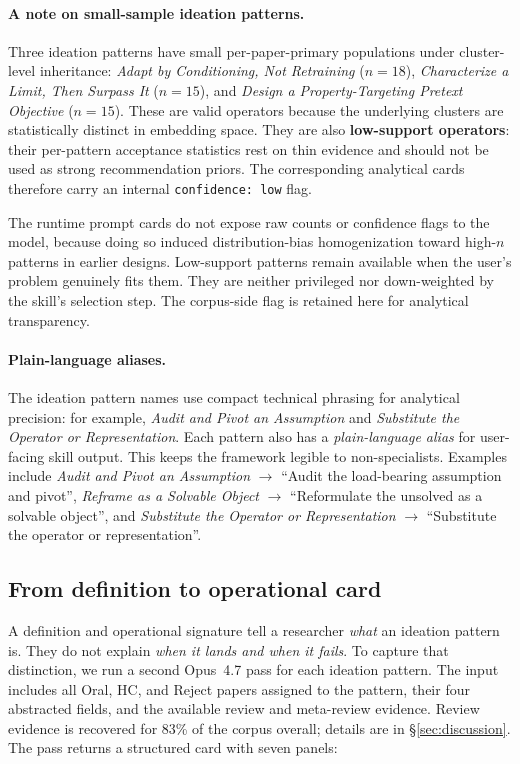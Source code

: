 \documentclass[10pt,a4paper]{article}
\begin{document}
\paragraph{A note on small-sample ideation patterns.} Three ideation patterns have small per-paper-primary populations under cluster-level inheritance: \emph{Adapt by Conditioning, Not Retraining} ($n{=}18$), \emph{Characterize a Limit, Then Surpass It} ($n{=}15$), and \emph{Design a Property-Targeting Pretext Objective} ($n{=}15$). These are valid operators because the underlying clusters are statistically distinct in embedding space. They are also \textbf{low-support operators}: their per-pattern acceptance statistics rest on thin evidence and should not be used as strong recommendation priors. The corresponding analytical cards therefore carry an internal \texttt{confidence: low} flag.

The runtime prompt cards do not expose raw counts or confidence flags to the model, because doing so induced distribution-bias homogenization toward high-$n$ patterns in earlier designs. Low-support patterns remain available when the user's problem genuinely fits them. They are neither privileged nor down-weighted by the skill's selection step. The corpus-side flag is retained here for analytical transparency.

\paragraph{Plain-language aliases.} The ideation pattern names use compact technical phrasing for analytical precision: for example, \emph{Audit and Pivot an Assumption} and \emph{Substitute the Operator or Representation}. Each pattern also has a \emph{plain-language alias} for user-facing skill output. This keeps the framework legible to non-specialists. Examples include \emph{Audit and Pivot an Assumption} $\to$ ``Audit the load-bearing assumption and pivot'', \emph{Reframe as a Solvable Object} $\to$ ``Reformulate the unsolved as a solvable object'', and \emph{Substitute the Operator or Representation} $\to$ ``Substitute the operator or representation''.

\subsection{From definition to operational card}
\label{subsec:cards}

A definition and operational signature tell a researcher \emph{what} an ideation pattern is. They do not explain \emph{when it lands and when it fails}. To capture that distinction, we run a second Opus~4.7 pass for each ideation pattern. The input includes all Oral, HC, and Reject papers assigned to the pattern, their four abstracted fields, and the available review and meta-review evidence. Review evidence is recovered for 83\% of the corpus overall; details are in \S\ref{sec:discussion}. The pass returns a structured card with seven panels:
\end{document}
